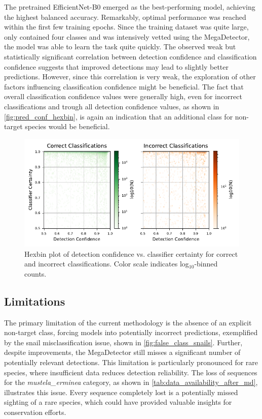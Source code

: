 The pretrained EfficientNet-B0 emerged as the best-performing model, achieving the highest balanced accuracy.
Remarkably, optimal performance was reached within the first few training epochs.
Since the training dataset was quite large, only contained four classes and was intensively vetted using the MegaDetector, the model was able to learn the task quite quickly.
The observed weak but statistically significant correlation between detection confidence and classification confidence suggests that improved detections may lead to slightly better predictions.
However, since this correlation is very weak, the exploration of other factors influencing classification confidence might be beneficial.
The fact that overall classification confidence values were generally high, even for incorrect classifications and trough all detection confidence values, as shown in \autoref{fig:pred_conf_hexbin}, is again an indication that an additional class for non-target species would be beneficial.

\begin{figure}[ht]
\centering
\includegraphics{figures/pred_conf_hexbin.pdf}
\caption{Hexbin plot of detection confidence vs. classifier certainty for correct and incorrect classifications. Color scale indicates log$_{10}$-binned counts.}
\label{fig:pred_conf_hexbin}
\end{figure}

\subsection{Limitations}

The primary limitation of the current methodology is the absence of an explicit non-target class, forcing models into potentially incorrect predictions, exemplified by the snail misclassification issue, shown in \autoref{fig:false_class_snails}.
Further, despite improvements, the MegaDetector still misses a significant number of potentially relevant detections.
This limitation is particularly pronounced for rare species, where insufficient data reduces detection reliability.
The loss of sequences for the \textit{mustela\_erminea} category, as shown in \autoref{tab:data_availability_after_md}, illustrates this issue.
Every sequence completely lost is a potentially missed sighting of a rare species, which could have provided valuable insights for conservation efforts.


